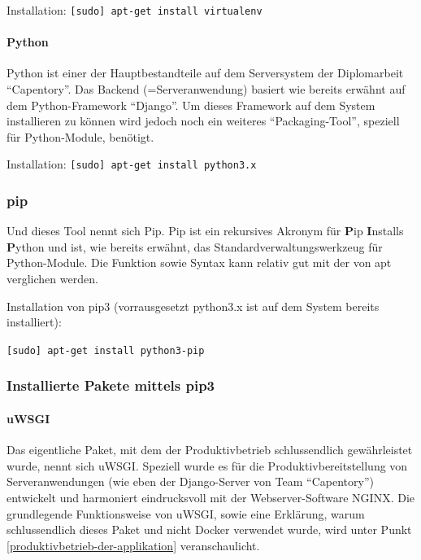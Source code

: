 Installation: \texttt{{[}sudo{]}\ apt-get\ install\ virtualenv}

\hypertarget{python}{%
\paragraph{Python}\label{python}}

Python ist einer der Hauptbestandteile auf dem Serversystem der
Diplomarbeit ``Capentory''. Das Backend (=Serveranwendung) basiert wie
bereits erwähnt auf dem Python-Framework ``Django''. Um dieses Framework
auf dem System installieren zu können wird jedoch noch ein weiteres
``Packaging-Tool'', speziell für Python-Module, benötigt.

Installation: \texttt{{[}sudo{]}\ apt-get\ install\ python3.x}

\hypertarget{pip}{%
\subsubsection{pip}\label{pip}}

Und dieses Tool nennt sich Pip. Pip ist ein rekursives Akronym für
\textbf{P}ip \textbf{I}nstalls \textbf{P}ython und ist, wie bereits
erwähnt, das Standardverwaltungswerkzeug für Python-Module. Die Funktion
sowie Syntax kann relativ gut mit der von apt verglichen werden.

Installation von pip3 (vorrausgesetzt python3.x ist auf dem System
bereits installiert):

\texttt{{[}sudo{]}\ apt-get\ install\ python3-pip}

\hypertarget{installierte-pakete-mittels-pip3}{%
\subsubsection{Installierte Pakete mittels
pip3}\label{installierte-pakete-mittels-pip3}}

\hypertarget{uwsgi}{%
\paragraph{uWSGI}\label{uwsgi}}

Das eigentliche Paket, mit dem der Produktivbetrieb schlussendlich
gewährleistet wurde, nennt sich uWSGI. Speziell wurde es für die
Produktivbereitstellung von Serveranwendungen (wie eben der
Django-Server von Team ``Capentory'') entwickelt und harmoniert
eindrucksvoll mit der Webserver-Software NGINX. Die grundlegende
Funktionsweise von uWSGI, sowie eine Erklärung, warum schlussendlich
dieses Paket und nicht Docker verwendet wurde, wird unter Punkt
\ref{produktivbetrieb-der-applikation} veranschaulicht.

